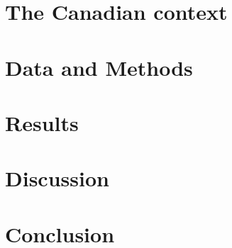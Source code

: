 \documentclass[12pt,letterpaper]{article}
\begin{document}
\section{The Canadian context}

\section{Data and Methods}

\section{Results}



\section{Discussion}

\section{Conclusion}
\end{document}
